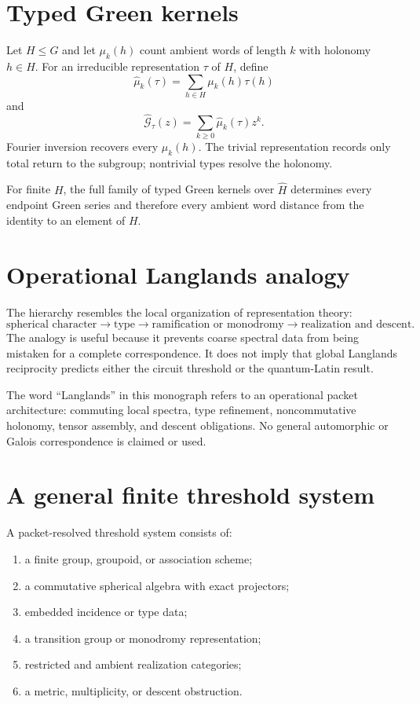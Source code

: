 \section{Typed Green kernels}
Let $H\le G$ and let $\mu_k(h)$ count ambient words of length $k$ with holonomy $h\in H$.  For an irreducible representation $\tau$ of $H$, define
\[
\widehat\mu_k(\tau)
=
\sum_{h\in H}\mu_k(h)\tau(h)
\]
and
\[
\widehat{\mathcal G}_\tau(z)
=
\sum_{k\ge0}\widehat\mu_k(\tau)z^k.
\]
Fourier inversion recovers every $\mu_k(h)$.  The trivial representation records only total return to the subgroup; nontrivial types resolve the holonomy.

\begin{provedbox}
For finite $H$, the full family of typed Green kernels over $\widehat H$ determines every endpoint Green series and therefore every ambient word distance from the identity to an element of $H$.
\end{provedbox}

\section{Operational Langlands analogy}
The hierarchy resembles the local organization of representation theory:
\[
\text{spherical character}
\to
\text{type}
\to
\text{ramification or monodromy}
\to
\text{realization and descent}.
\]
The analogy is useful because it prevents coarse spectral data from being mistaken for a complete correspondence.  It does not imply that global Langlands reciprocity predicts either the circuit threshold or the quantum-Latin result.

\begin{boundarybox}
The word ``Langlands'' in this monograph refers to an operational packet architecture: commuting local spectra, type refinement, noncommutative holonomy, tensor assembly, and descent obligations.  No general automorphic or Galois correspondence is claimed or used.
\end{boundarybox}

\section{A general finite threshold system}
A packet-resolved threshold system consists of:
\begin{enumerate}
\item a finite group, groupoid, or association scheme;
\item a commutative spherical algebra with exact projectors;
\item embedded incidence or type data;
\item a transition group or monodromy representation;
\item restricted and ambient realization categories;
\item a metric, multiplicity, or descent obstruction.
\end{enumerate}

